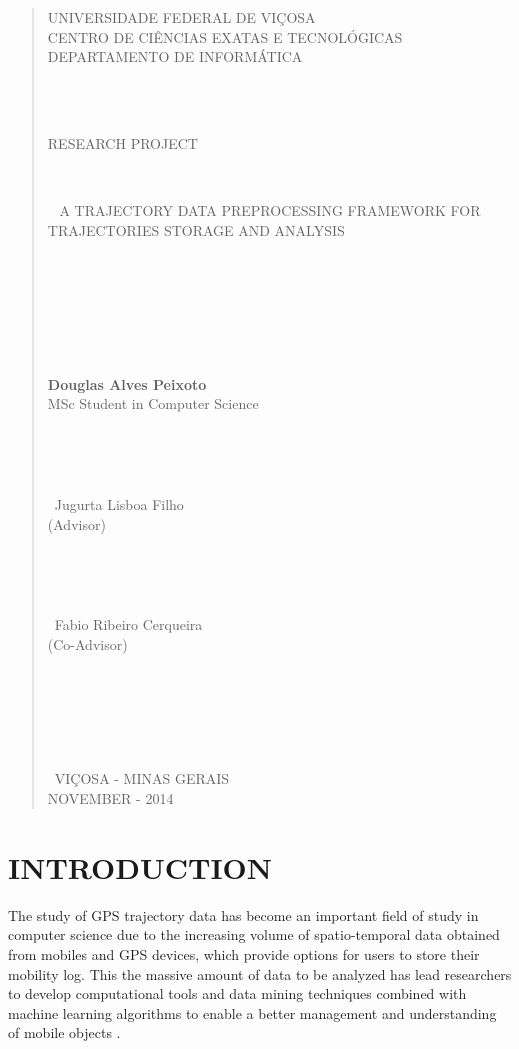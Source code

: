 \documentclass[a4paper,12pt]{article}
\begin{document}
\begin{quote}
\centering
UNIVERSIDADE FEDERAL DE VIÇOSA\\
CENTRO DE CIÊNCIAS EXATAS E TECNOLÓGICAS\\
DEPARTAMENTO DE INFORMÁTICA\\

\large 
\

\

RESEARCH PROJECT

\

\
\centering 
A TRAJECTORY DATA PREPROCESSING FRAMEWORK FOR TRAJECTORIES STORAGE AND ANALYSIS\\

\

\

\

\
\normalsize
\begin{flushright}
\textbf{Douglas Alves Peixoto}\\ 
MSc Student in Computer Science
\end{flushright}

\

\

\
Jugurta Lisboa Filho \\
(Advisor)
\

\

\

\
Fabio Ribeiro Cerqueira \\
(Co-Advisor)
\

\

\

\

\
VIÇOSA - MINAS GERAIS\\
NOVEMBER - 2014
\end{quote}

\newpage    %

\onehalfspacing       %
\tableofcontents      %

\newpage    %

\section{INTRODUCTION}\label{sec:intro}
The study of GPS trajectory data has become an important field of study in computer science due to the increasing volume of spatio-temporal data obtained from mobiles and GPS devices, which provide options for users to store their mobility log. This the massive amount of data to be analyzed has lead researchers to develop computational tools and data mining techniques combined with machine learning algorithms to enable a better management and understanding of mobile objects \cite{gudmundsson2012}.
\end{document}

